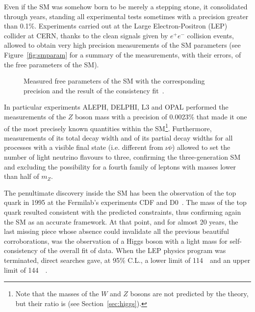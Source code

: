 Even if the SM was somehow born to be merely a stepping stone, 
it consolidated through years, standing all experimental tests 
sometimes with a precision greater than 0.1\%. Experiments carried 
out at the Large Electron-Positron (LEP) collider at CERN, 
thanks to the clean signals given by $e^{+}e^{-}$ collision events, 
allowed to obtain very high precision measurements of the SM parameters
(see Figure~\ref{fig:smparam} for a summary of the measurements, with
their errors, of the free parameters of the SM).
\begin{figure}[htb]\begin{center}
	\caption{Measured free parameters of the SM with the corresponding
          precision and the result of the consistency fit~\cite{Renton}.}
\end{center}\end{figure}
 
In particular experiments ALEPH, DELPHI, L3 and OPAL performed the measurements 
of the $Z$ boson mass with a precision of 0.0023\% that made it one of the most 
precisely known quantities within the SM\footnote{Note that the masses of the 
$W$ and $Z$ bosons are not predicted by the theory, but their ratio is (see 
Section~\ref{sec:higgs}).}. Furthermore, measurements of its total 
decay width and of its partial decay widths for all processes with a 
visible final state (i.e. different from $\nu\bar\nu$) allowed to set 
the number of light neutrino flavours to three, confirming the three-generation 
SM and excluding the possibility for a fourth family of leptons with masses lower 
than half of $m_Z$.

The penultimate discovery inside the SM has been the observation of the 
top quark in 1995 at the Fermilab's experiments CDF and D0~\cite{}. 
The mass of the top quark resulted consistent with the predicted 
constraints, thus confirming again the SM as an accurate framework. 
At that point, and for almost 20 years, the last missing piece whose
absence could invalidate all the previous beautiful corroborations, was
the observation of a Higgs boson with a light mass for  self-consistency 
of the overall fit of data. When the LEP physics program was terminated,
direct searches gave, at 95\% C.L., a lower limit of 114~\gev\ and an upper 
limit of 144~\gev~\cite{Renton}.
